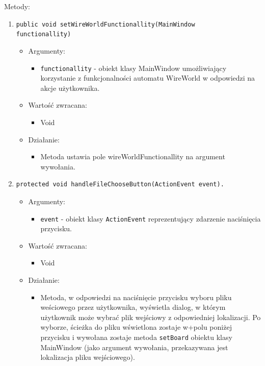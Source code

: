 \documentclass[a4paper,11pt, notitlepage ]{article}
\begin{document}
Metody:

\begin{enumerate}

\item \verb+public void setWireWorldFunctionallity(MainWindow+ \\ \verb+functionallity)+
\begin{itemize}
\item Argumenty:
\begin{itemize}
\item \verb+functionallity+ - obiekt klasy MainWindow umożliwiający korzystanie z funkcjonalności automatu WireWorld w odpowiedzi na akcje użytkownika.
\end{itemize}
\item Wartość zwracana:
\begin{itemize}
\item Void
\end{itemize}
\item Działanie:
\begin{itemize}
\item Metoda ustawia pole wireWorldFunctionallity na argument wywołania.
\end{itemize}
\end{itemize}


\item \begin{verbatim}protected void handleFileChooseButton(ActionEvent event). \end{verbatim}
\begin{itemize}
\item Argumenty:
\begin{itemize}
\item \verb+event+ - obiekt klasy \verb+ActionEvent+ reprezentujący zdarzenie naciśnięcia przycisku.
\end{itemize}
\item Wartość zwracana:
\begin{itemize}
\item Void
\end{itemize}
\item Działanie:
\begin{itemize}
\item Metoda, w odpowiedzi na naciśnięcie przycisku wyboru pliku weściowego przez użytkownika, wyświetla dialog, w którym użytkownik może wybrać plik wejściowy z odpowiedniej lokalizacji. Po wyborze, ścieżka do pliku wświetlona zostaje w+polu poniżej przycisku i wywołana zostaje metoda \verb+setBoard+ obiektu klasy MainWindow (jako argument wywołania, przekazywana jest lokalizacja pliku wejściowego).
\end{itemize}
\end{itemize}



\end{enumerate}
\end{document}
